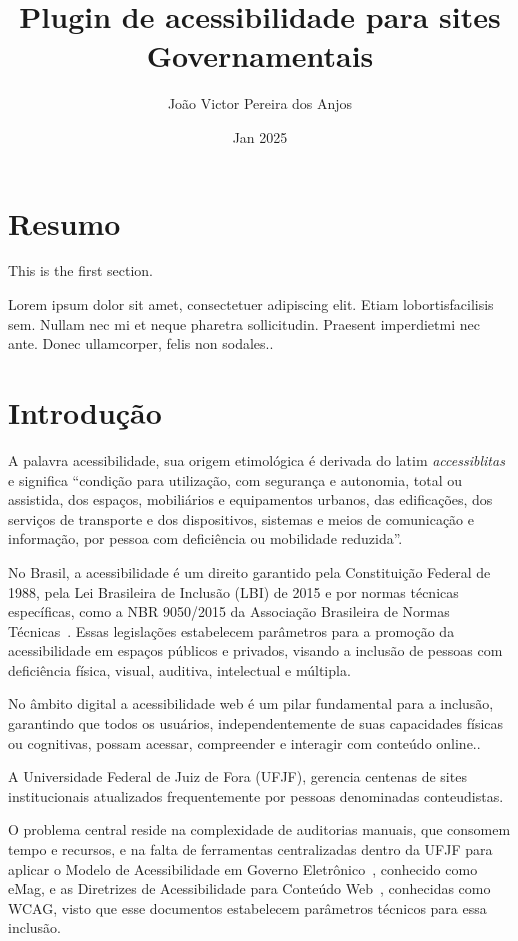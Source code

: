 \documentclass[12pt]{article}
\title{Plugin de acessibilidade para sites Governamentais}
\author{João Victor Pereira dos Anjos}
\date{Jan 2025}
\begin{document}
\maketitle
  
\tableofcontents

\section{Resumo}
   
This is the first section.
      
Lorem  ipsum  dolor  sit  amet,  consectetuer  adipiscing  
elit.   Etiam  lobortisfacilisis sem.  Nullam nec mi et 
neque pharetra sollicitudin.  Praesent imperdietmi nec ante. 
Donec ullamcorper, felis non sodales..

\section{Introdução}

A palavra acessibilidade, sua origem etimológica é derivada do latim \textit{accessiblitas} 
e significa ``condição para utilização, com segurança e autonomia, 
total ou assistida, dos espaços, mobiliários e equipamentos urbanos, das 
edificações, dos serviços de transporte e dos dispositivos, sistemas e meios de
comunicação e informação, por pessoa com deficiência ou mobilidade reduzida''\cite{Acessibilidade}.

No Brasil, a acessibilidade é um direito garantido pela Constituição 
Federal de 1988, pela Lei Brasileira de Inclusão (LBI) de 2015 \Cite{LBI}
e por normas técnicas específicas, como a NBR 9050/2015 da Associação 
Brasileira de Normas Técnicas~\cite{ABNT}. Essas legislações estabelecem 
parâmetros para a promoção da acessibilidade em espaços públicos e privados,
visando a inclusão de pessoas com deficiência física, visual, auditiva, 
intelectual e múltipla.

No âmbito digital a acessibilidade web é um pilar fundamental para a 
inclusão, garantindo que todos os usuários, independentemente de suas
capacidades físicas ou cognitivas, possam acessar, compreender e interagir com
conteúdo online.\cite{wcag22}. 

A Universidade Federal de Juiz de Fora (UFJF), gerencia centenas 
de sites institucionais atualizados frequentemente por pessoas denominadas
conteudistas. 

O problema central reside na complexidade de auditorias manuais, que consomem
tempo e recursos, e na falta de ferramentas centralizadas dentro da UFJF para
aplicar o Modelo de Acessibilidade em 
Governo Eletrônico~\cite{emag}, conhecido como eMag, e as Diretrizes 
de Acessibilidade para Conteúdo Web~\cite{wcag22}, conhecidas como 
WCAG, visto que esse documentos estabelecem parâmetros técnicos para essa inclusão.
\end{document}
